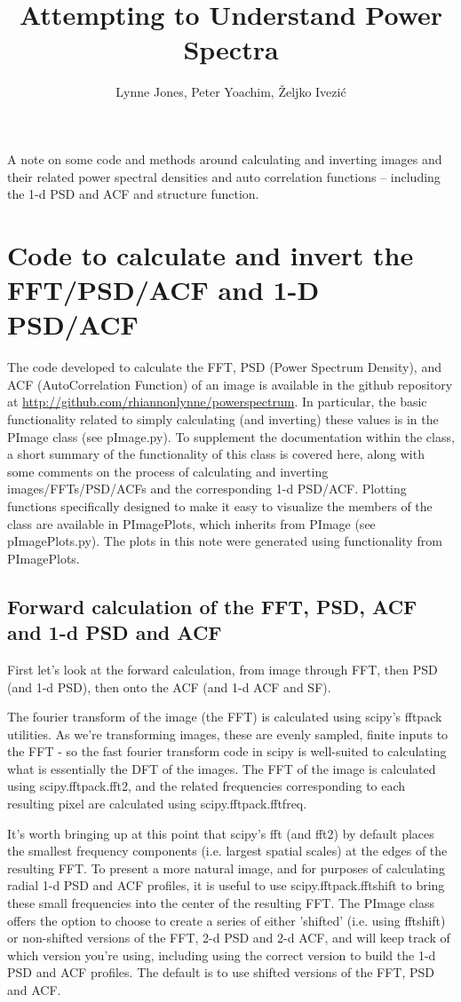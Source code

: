 \documentclass[11pt,preprint]{aastex}
\begin{document}
\title{Attempting to Understand Power Spectra}
\author{Lynne Jones, Peter Yoachim, {\v Z}eljko Ivezi{\'c}}



A note on some code and methods around calculating and inverting images and their related power spectral densities and auto correlation functions -- including the 1-d PSD and ACF and structure function.

\section{Code to calculate and invert the FFT/PSD/ACF and 1-D PSD/ACF}

The code developed to calculate the FFT, PSD (Power Spectrum Density), and ACF (AutoCorrelation Function) of an image is available in the github repository at \url{http://github.com/rhiannonlynne/powerspectrum}. In particular, the basic functionality related to simply calculating (and inverting) these values is in the PImage class (see pImage.py). To supplement the documentation within the class, a short summary of the functionality of this class is covered here, along with some comments on the process of calculating and inverting images/FFTs/PSD/ACFs and the corresponding 1-d PSD/ACF.  Plotting functions specifically designed to make it easy to visualize the members of the class are available in PImagePlots, which inherits from PImage (see pImagePlots.py). The plots in this note were generated using functionality from PImagePlots.

\subsection{Forward calculation of the FFT, PSD, ACF and 1-d PSD and ACF}

First let's look at the forward calculation, from image through FFT, then PSD (and 1-d PSD), then onto the ACF (and 1-d ACF and SF). 

The fourier transform of the image (the FFT) is calculated using scipy's fftpack utilities. As we're transforming images, these are evenly sampled, finite inputs to the FFT - so the fast fourier transform code in scipy is well-suited to calculating what is essentially the DFT of the images. The FFT of the image is calculated using scipy.fftpack.fft2, and the related frequencies corresponding to each resulting pixel are calculated using scipy.fftpack.fftfreq.  

It's worth bringing up at this point that scipy's fft (and fft2) by default places the smallest frequency components (i.e. largest spatial scales) at the edges of the resulting FFT. To present a more natural image, and for purposes of calculating radial 1-d PSD and ACF profiles, it is useful to use scipy.fftpack.fftshift to bring these small frequencies into the center of the resulting FFT. The PImage class offers the option to choose to create a series of either 'shifted' (i.e. using fftshift) or non-shifted versions of the FFT, 2-d PSD and 2-d ACF, and will keep track of which version you're using, including using the correct version to build the 1-d PSD and ACF profiles. The default is to use shifted versions of the FFT, PSD and ACF. 
\end{document}
